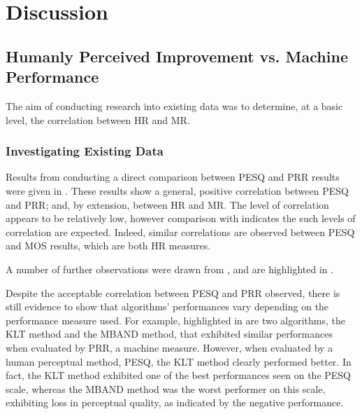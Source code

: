 %

\chapter{Discussion}

\acresetall


\section{Humanly Perceived Improvement vs. Machine Performance}

The aim of conducting research into existing data was to determine,
at a basic level, the correlation between \ac{HR} and \ac{MR}.


\subsection{Investigating Existing Data}

Results from conducting a direct comparison between \ac{PESQ} and
\ac{PRR} results were given in . These results
show a general, positive correlation between \ac{PESQ} and \ac{PRR};
and, by extension, between \ac{HR} and \ac{MR}. The level of correlation
appears to be relatively low, however comparison with 
indicates the such levels of correlation are expected. Indeed, similar
correlations are observed between \ac{PESQ} and \ac{MOS} results,
which are both \ac{HR} measures.

A number of further observations were drawn from ,
and are highlighted in .

Despite the acceptable correlation between \ac{PESQ} and \ac{PRR}
observed, there is still evidence to show that algorithms' performances
vary depending on the performance measure used. For example, highlighted
in  are two algorithms, the \ac{KLT} method
and the \ac{MBAND} method, that exhibited similar performances when
evaluated by \ac{PRR}, a machine measure. However, when evaluated
by a human perceptual method, \ac{PESQ}, the \ac{KLT} method clearly
performed better. In fact, the \ac{KLT} method exhibited one of the
best performances seen on the \ac{PESQ} scale, whereas the \ac{MBAND}
method was the worst performer on this scale, exhibiting loss in perceptual
quality, as indicated by the negative performance.

